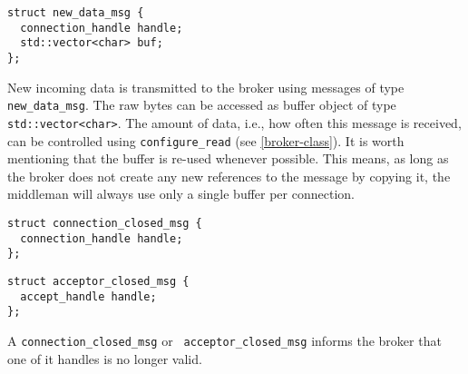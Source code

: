 \begin{lstlisting}
struct new_data_msg {
  connection_handle handle;
  std::vector<char> buf;
};
\end{lstlisting}

New incoming data is transmitted to the broker using messages of type \lstinline^new_data_msg^.
The raw bytes can be accessed as buffer object of type \lstinline^std::vector<char>^.
The amount of data, i.e., how often this message is received, can be controlled using \lstinline^configure_read^ (see \ref{broker-class}).
It is worth mentioning that the buffer is re-used whenever possible.
This means, as long as the broker does not create any new references to the message by copying it, the middleman will always use only a single buffer per connection.

\begin{lstlisting}
struct connection_closed_msg {
  connection_handle handle;
};
\end{lstlisting}

\begin{lstlisting}
struct acceptor_closed_msg {
  accept_handle handle;
};
\end{lstlisting}


A \lstinline^connection_closed_msg^ or \lstinline^ acceptor_closed_msg^ informs the broker that one of it handles is no longer valid.
